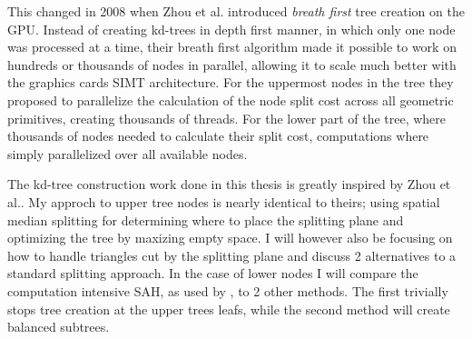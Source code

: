 This changed in 2008 when Zhou et al. introduced
\textit{breath first} tree creation on the GPU. Instead of creating
kd-trees in depth first manner, in which only one node was processed
at a time, their breath first algorithm made it possible to work on
hundreds or thousands of nodes in parallel, allowing it to scale much
better with the graphics cards SIMT architecture. For the uppermost
nodes in the tree they proposed to parallelize the calculation of the
node split cost across all geometric primitives, creating thousands of
threads. For the lower part of the tree, where thousands of nodes
needed to calculate their split cost, computations where simply
parallelized over all available nodes.



The kd-tree construction work done in this thesis is greatly inspired
by Zhou et al.. My approch to upper tree nodes is
nearly identical to theirs; using spatial median splitting for
determining where to place the splitting plane and optimizing the tree
by maxizing empty space. I will however also be focusing on how to
handle triangles cut by the splitting plane and discuss 2 alternatives
to a standard splitting approach. In the case of lower nodes I will
compare the computation intensive SAH, as used by \zhou, to 2 other
methods. The first trivially stops tree creation at the upper trees
leafs, while the second method will create balanced subtrees.
